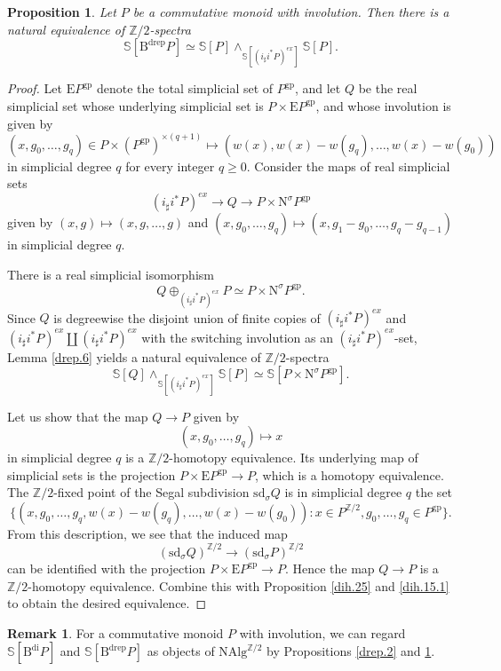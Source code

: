 \documentclass[10pt]{amsart}
\newtheorem{prop}[thm]{Proposition}
\theoremstyle{definition}
\newtheorem{rmk}[thm]{Remark}
\theoremstyle{remark}
\numberwithin{equation}{section}
\newcommand{\Sphere}{\mathbb{S}}
\newcommand{\rE}{\mathrm{E}}
\newcommand{\NAlg}{\mathrm{NAlg}}
\newcommand{\Bdi}{\mathrm{B}^{\mathrm{di}}}
\newcommand{\Bdrep}{\mathrm{B}^\mathrm{drep}}
\newcommand{\Nsigma}{\mathrm{N}^\sigma}
\newcommand{\sd}{\mathrm{sd}}
\newcommand{\gp}{\mathrm{gp}}
\newcommand{\Ztwo}{{\mathbb{Z}/2}}
\begin{document}
\begin{prop}
\label{dih.15}
Let $P$ be a commutative monoid with involution.
Then there is a natural equivalence of $\Ztwo$-spectra
\[
\Sphere[\Bdrep P]
\simeq
\Sphere[P]\wedge_{\Sphere[(i_\sharp i^*P)^{ex}]} \Sphere[P].
\]
\end{prop}
\begin{proof}
Let $\rE P^\gp$ denote the total simplicial set of $P^\gp$,
and let $Q$ be the real simplicial set whose underlying simplicial set is $P\times \rE P^\gp$,
and whose involution is given by
\[
(x,g_0,\ldots,g_q)\in P\times (P^\gp)^{\times(q+1)}
\mapsto
(w(x),w(x)-w(g_q),\ldots,w(x)-w(g_0))
\]
in simplicial degree $q$ for every integer $q\geq 0$.
Consider the maps of real simplicial sets
\[
(i_\sharp i^* P)^{ex} \to Q \to P\times \Nsigma P^\gp
\]
given by
$
(x,g)
\mapsto
(x,g,\ldots,g)
$
and
$
(x,g_0,\ldots,g_q)
\mapsto
(x,g_1-g_0,\ldots,g_q-g_{q-1})
$
in simplicial degree $q$.

There is a real simplicial isomorphism
\[
Q \oplus_{(i_\sharp i^*P)^{ex}} P
\simeq
P\times \Nsigma P^\gp.
\]
Since $Q$ is degreewise the disjoint union of finite copies of $(i_\sharp i^*P)^{ex}$ and $(i_\sharp i^*P)^{ex}\amalg (i_\sharp i^*P)^{ex}$ with the switching involution as an $(i_\sharp i^*P)^{ex}$-set, Lemma \ref{drep.6} yields a natural equivalence of $\Ztwo$-spectra
\begin{equation}
\label{dih.15.1}
\Sphere[Q] \wedge_{\Sphere[(i_\sharp i^*P)^{ex}]} \Sphere[P]
\simeq
\Sphere[P\times \Nsigma P^\gp].
\end{equation}

Let us show that the map $Q\to P$ given by
\[
(x,g_0,\ldots,g_q)\mapsto x
\]
in simplicial degree $q$ is a $\Ztwo$-homotopy equivalence. Its underlying map of simplicial sets is the projection $P\times \rE P^\gp \to P$, which is a homotopy equivalence.
The $\Ztwo$-fixed point of the Segal subdivision $\sd_{\sigma} Q$ is in simplicial degree $q$ the set
\[
\{
(x,g_0,\ldots,g_q,w(x)-w(g_q),\ldots,w(x)-w(g_0))
:
x\in P^{\Ztwo},g_0,\ldots,g_q\in P^\gp
\}.
\]
From this description,
we see that the induced map
\[
(\sd_{\sigma} Q)^{\Ztwo}
\to
(\sd_{\sigma} P)^{\Ztwo}
\]
can be identified with the projection $P\times \rE P^\gp \to P$.
Hence the map $Q\to P$ is a $\Ztwo$-homotopy equivalence.
Combine this with Proposition \ref{dih.25} and \eqref{dih.15.1} to obtain the desired equivalence.
\end{proof}

\begin{rmk}
For a commutative monoid $P$ with involution,
we can regard $\Sphere[\Bdi P]$ and $\Sphere[\Bdrep P]$ as objects of $\NAlg^{\Ztwo}$ by Propositions \ref{drep.2} and \ref{dih.15}.
\end{rmk}
\end{document}
